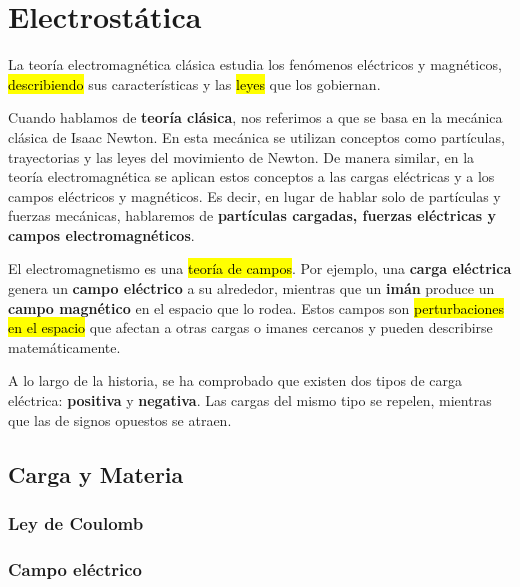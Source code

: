 \section{Electrostática}

La teoría electromagnética clásica estudia los fenómenos eléctricos y magnéticos, \hl{describiendo} sus características y las \hl{leyes} que los gobiernan.  

Cuando hablamos de \textbf{teoría clásica}, nos referimos a que se basa en la mecánica clásica de Isaac Newton. En esta mecánica se utilizan conceptos como partículas, trayectorias y las leyes del movimiento de Newton. De manera similar, en la teoría electromagnética se aplican estos conceptos a las cargas eléctricas y a los campos eléctricos y magnéticos. Es decir, en lugar de hablar solo de partículas y fuerzas mecánicas, hablaremos de \textbf{partículas cargadas, fuerzas eléctricas y campos electromagnéticos}.  

El electromagnetismo es una \hl{teoría de campos}. Por ejemplo, una \textbf{carga eléctrica} genera un \textbf{campo eléctrico} a su alrededor, mientras que un \textbf{imán} produce un \textbf{campo magnético} en el espacio que lo rodea. Estos campos son \hl{perturbaciones en el espacio} que afectan a otras cargas o imanes cercanos y pueden describirse matemáticamente.  

A lo largo de la historia, se ha comprobado que existen dos tipos de carga eléctrica: \textbf{positiva} y \textbf{negativa}. Las cargas del mismo tipo se repelen, mientras que las de signos opuestos se atraen.  

\subsection{Carga y Materia}



\subsubsection{Ley de Coulomb}



\subsubsection{Campo eléctrico}



